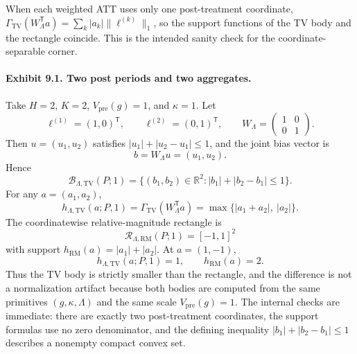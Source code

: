 \documentclass[11pt]{article}
\newcommand{\transpose}{\mathsf{T}}
\newcommand{\R}{\mathbb{R}}
\theoremstyle{definition}
\theoremstyle{plain}
\theoremstyle{remark}
\begin{document}
When each weighted ATT uses only one post-treatment coordinate, \(\Gamma_{\mathrm{TV}}(W_\Lambda^\transpose a)=\sum_k |a_k|\|\ell^{(k)}\|_1\), so the support functions of the TV body and the rectangle coincide. This is the intended sanity check for the coordinate-separable corner.

\paragraph{Exhibit 9.1. Two post periods and two aggregates.}
Take \(H=2\), \(K=2\), \(V_{\mathrm{pre}}(g)=1\), and \(\kappa=1\). Let
\[
\ell^{(1)}=(1,0)^\transpose,\qquad
\ell^{(2)}=(0,1)^\transpose,
\qquad
W_\Lambda=
\begin{pmatrix}
1 & 0\\
0 & 1
\end{pmatrix}.
\]
Then \(u=(u_1,u_2)\) satisfies \(|u_1|+|u_2-u_1|\le 1\), and the joint bias vector is
\[
b=W_\Lambda u=(u_1,u_2).
\]
Hence
\[
\mathcal B_{\Lambda,\mathrm{TV}}(P;1)
=
\{(b_1,b_2)\in\R^2: |b_1|+|b_2-b_1|\le 1\}.
\]
For any \(a=(a_1,a_2)\),
\[
h_{\Lambda,\mathrm{TV}}(a;P,1)
=
\Gamma_{\mathrm{TV}}(W_\Lambda^\transpose a)
=
\max\{|a_1+a_2|,\ |a_2|\}.
\]
The coordinatewise relative-magnitude rectangle is
\[
\mathcal R_{\Lambda,\mathrm{RM}}(P;1)=[-1,1]^2
\]
with support \(h_{\mathrm{RM}}(a)=|a_1|+|a_2|\). At \(a=(1,-1)\),
\[
h_{\Lambda,\mathrm{TV}}(a;P,1)=1,\qquad
h_{\mathrm{RM}}(a)=2.
\]
Thus the TV body is strictly smaller than the rectangle, and the difference is not a normalization artifact because both bodies are computed from the same primitives \((g,\kappa,\Lambda)\) and the same scale \(V_{\mathrm{pre}}(g)=1\). The internal checks are immediate: there are exactly two post-treatment coordinates, the support formulas use no zero denominator, and the defining inequality \(|b_1|+|b_2-b_1|\le 1\) describes a nonempty compact convex set.
\end{document}
